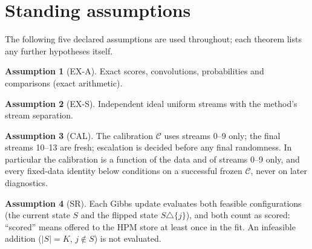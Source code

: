 \documentclass[11pt]{article}
\theoremstyle{definition}
\newtheorem{assumption}{Assumption}
\theoremstyle{remark}
\newcommand{\cC}{\mathcal C}
\begin{document}
\section{Standing assumptions}\label{sec:assumptions}

The following five declared assumptions are used throughout; each theorem lists any further hypotheses itself.

\begin{assumption}[EX-A]\label{as:exa}
Exact scores, convolutions, probabilities and comparisons (exact arithmetic).
\end{assumption}

\begin{assumption}[EX-S]\label{as:exs}
Independent ideal uniform streams with the method's stream separation.
\end{assumption}

\begin{assumption}[CAL]\label{as:cal}
The calibration $\cC$ uses streams 0--9 only; the final streams 10--13 are fresh; escalation is decided before any
final randomness. In particular the calibration is a function of the data and of streams 0--9 only, and every
fixed-data identity below conditions on a successful frozen $\cC$, never on later diagnostics.
\end{assumption}

\begin{assumption}[SR]\label{as:sr}
Each Gibbs update evaluates both feasible configurations (the current state $S$ and the flipped state
$S\triangle\{j\}$), and both count as scored: ``scored'' means offered to the HPM store at least once in the fit.
An infeasible addition ($|S|=K$, $j\notin S$) is not evaluated.
\end{assumption}
\end{document}
